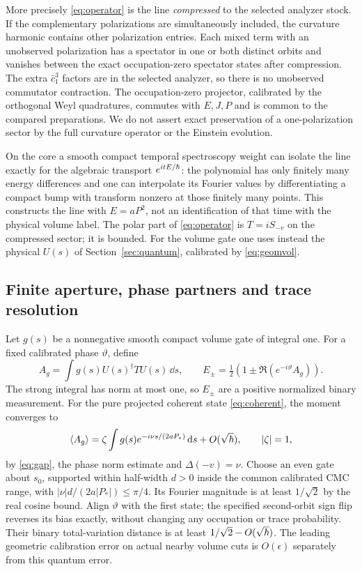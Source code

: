 More precisely \eqref{eq:operator} is the line \emph{compressed} to the selected analyzer stock. If the complementary polarizations are simultaneously included, the curvature harmonic contains other polarization entries. Each mixed term with an unobserved polarization has a spectator in one or both distinct orbits and vanishes between the exact occupation-zero spectator states after compression. The extra \(\bar c_1^3\) factors are in the selected analyzer, so there is no unobserved commutator contraction. The occupation-zero projector, calibrated by the orthogonal Weyl quadratures, commutes with \(E,J,P\) and is common to the compared preparations. We do not assert exact preservation of a one-polarization sector by the full curvature operator or the Einstein evolution.

On the core a smooth compact temporal spectroscopy weight can isolate the line exactly for the algebraic transport \(e^{itE/\hbar}\): the polynomial has only finitely many energy differences and one can interpolate its Fourier values by differentiating a compact bump with transform nonzero at those finitely many points. This constructs the line with \(E=aP^2\), not an identification of that time with the physical volume label. The polar part of \eqref{eq:operator} is \(T=iS_{-v}\) on the compressed sector; it is bounded. For the volume gate one uses instead the physical \(U(s)\) of Section~\ref{sec:quantum}, calibrated by \eqref{eq:geomvol}.

\subsection{Finite aperture, phase partners and trace resolution}

Let \(g(s)\) be a nonnegative smooth compact volume gate of integral one. For a fixed calibrated phase \(\vartheta\), define
\begin{equation}\label{eq:povm}
 A_g=\int g(s)U(s)^\dagger T U(s)\,\dd s,\qquad
 E_\pm=\tfrac12\!\left(1\pm\Re(e^{-i\vartheta}A_g)\right).
\end{equation}
The strong integral has norm at most one, so \(E_\pm\) are a positive normalized binary measurement. For the pure projected coherent state \eqref{eq:coherent}, the moment converges to
\[
   \langle A_g\rangle
   =\zeta\int g(s)e^{-i\nu s/(2aP_*)}\,\mathrm d s+O(\sqrt{\hbar}),
             \qquad |\zeta|=1 ,
\]
by \eqref{eq:gap}, the phase norm estimate and \(\Delta(-v)=\nu\). Choose an even gate about \(s_0\), supported within half-width \(d>0\) inside the common calibrated CMC range, with \(|\nu|d/(2a|P_*|)\leq\pi/4\). Its Fourier magnitude is at least \(1/\sqrt2\) by the real cosine bound. Align \(\vartheta\) with the first state; the specified second-orbit sign flip reverses its bias exactly, without changing any occupation or trace probability. Their binary total-variation distance is at least \(1/\sqrt2-O(\sqrt{\hbar})\). The leading geometric calibration error on actual nearby volume cuts is \(O(\epsilon)\) separately from this quantum error.


